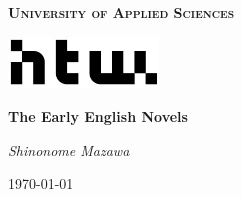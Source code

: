 \documentclass[a4paper]{article}
\begin{document}
\begin{titlepage}
    \centering
    {\scshape\Huge \bfseries{University of Applied Sciences} \par}
    \par\vspace{1cm}
    \includegraphics[width=0.3\textwidth]{images/bwhtwlogo.jpg}\par
    \vspace{3cm}
    {\huge\bfseries The Early English Novels \par}
    \vspace{1cm}
    {\LARGE\itshape Shinonome Mazawa \par}
    \vspace{1cm}
    {\large\today\par}
    \vfill
    \begin{abstract}
        Through the example of three popular contenders for the first English novel, 
        this document serves as an introduction to the novel genre and how it first 
        came into being.  
    \end{abstract}
\end{titlepage}

\newpage

\tableofcontents
{}

\newpage











\newpage

\medskip
\printbibliography
\end{document}
